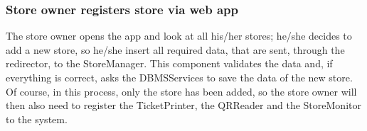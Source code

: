 \subsubsection{Store owner registers store via web app}
\begin{figure}[H]
	\noindent
\end{figure}
The store owner opens the app and look at all his/her stores; he/she decides to add a new store, so he/she insert all required data, that are sent, through the redirector, to the StoreManager. This component validates the data and, if everything is correct, asks the DBMSServices to save the data of the new store.\\
Of course, in this process, only the store has been added, so the store owner will then also need to register the TicketPrinter, the QRReader and the StoreMonitor to the system.

